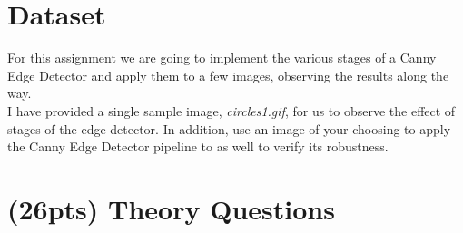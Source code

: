 \documentclass[12pt]{article}
\begin{document}
\newpage
\section*{Dataset}
For this assignment we are going to implement the various stages of a Canny Edge Detector and apply them to a few images, observing the results along the way.\\

\noindent
I have provided a single sample image, \emph{circles1.gif}, for us to observe the effect of stages of the edge detector.   In addition, use an image of your choosing to apply the Canny Edge Detector pipeline to as well to verify its robustness.

\newpage
\section{(26pts) Theory Questions}
\end{document}
